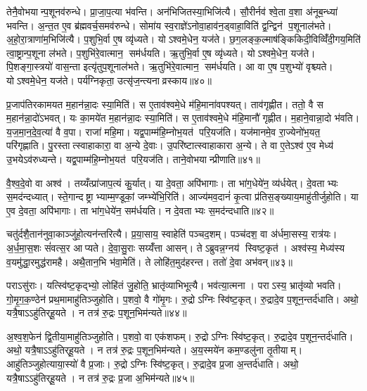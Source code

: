 तेनै॒वोभयान्प॒शूनव॑रुन्धे। प्रा॒जा॒प॒त्या भ॑वन्ति। अन॑भिजितस्या॒भिजि॑त्यै। सौ॒रीर्नव॑ श्वे॒ता व॒शा अ॑नूब॒न्ध्या॑ भवन्ति। अ॒न्त॒त ए॒व ब्र॑ह्मवर्च॒समव॑रुन्धे। सोमा॑य स्व॒राज्ञे॑ऽनोवा॒हाव॑न॒ड्वाहा॒विति॑ द्व॒न्द्विन॑ प॒शूनाल॑भते। अ॒हो॒रा॒त्राणा॑म॒भिजि॑त्यै। प॒शुभि॒र्वा ए॒ष व्यृ॑ध्यते। योऽश्वमे॒धेन॒ यज॑ते। छ॒ग॒लङ्क॒ल्माष॑ङ्किकिदी॒विव्विँ॑दी॒गय॒मिति॑ त्वा॒ष्ट्रान्प॒शूना ल॑भते। प॒शुभि॑रे॒वात्मान॒ सम॑र्धयति। ऋ॒तुभि॒र्वा ए॒ष व्यृ॑ध्यते। योऽश्वमे॒धेन॒ यज॑ते। पि॒शङ्गा॒स्त्रयो॑ वास॒न्ता इत्यृ॑तुप॒शूनाल॑भते। ऋ॒तुभि॑रे॒वात्मान॒ सम॑र्धयति। आ वा ए॒ष प॒शुभ्यो॑ वृश्च्यते। योऽश्वमे॒धेन॒ यज॑ते। पर्य॑ग्निकृता॒ उत्सृ॑ज॒न्त्यनाव्रस्काय॥४०॥\anuvakamend[ल॒भ्य॒न्ते॒ ल॒भ॒ते॒ त्वा॒ष्ट्रान्प॒शूनाल॑भते॒ऽष्टौ च॑]

प्र॒जाप॑तिरकामयत म॒हान॑न्ना॒दः स्या॒मिति॑। स ए॒ताव॑श्वमे॒धे म॑हि॒माना॑वपश्यत्। ताव॑गृह्णीत। ततो॒ वै स म॒हान॑न्ना॒दो॑ऽभवत्। यः का॒मये॑त म॒हान॑न्ना॒दः स्या॒मिति॑। स ए॒ताव॑श्वमे॒धे म॑हि॒मानौ॑ गृह्णीत। म॒हाने॒वान्ना॒दो भ॑वति। य॒ज॒मा॒न॒दे॒व॒त्या॑ वै व॒पा। राजा॑ महि॒मा। यद्व॒पाम्म॑हि॒म्नोभ॒यत॑ परि॒यज॑ति। यज॑मानमे॒व रा॒ज्येनो॑भ॒यत॒ परि॑गृह्णाति। पु॒रस्तात्स्वाहाकारा॒ वा अ॒न्ये दे॒वाः। उ॒परि॑ष्टात्स्वाहाकारा अ॒न्ये। ते वा ए॒तेऽश्व॑ ए॒व मेध्य॑ उ॒भयेऽव॑रुध्यन्ते। यद्व॒पाम्म॑हि॒म्नोभ॒यत॑ परि॒यज॑ति। ताने॒वोभयान्प्रीणाति॥४१॥\anuvakamend[प॒रि॒यज॑ति॒ षट्च॑]

वै॒श्व॒दे॒वो वा अश्व॑। तय्यँत्प्रा॑जाप॒त्यं कु॒र्यात्। या दे॒वता॒ अपि॑भागाः। ता भा॑ग॒धेये॑न॒ व्य॑र्धयेत्। दे॒वताभ्यः स॒मद॑न्दध्यात्। स्ते॒गान्दष्ट्राभ्याम्म॒ण्डूकां॒ जम्भ्ये॑भि॒रिति॑। आज्य॑मव॒दानं॑ कृ॒त्वा प्र॑तिस॒ङ्ख्याय॒माहु॑तीर्जुहोति। या ए॒व दे॒वता॒ अपि॑भागाः। ता भा॑ग॒धेये॑न॒ सम॑र्धयति। न दे॒वताभ्यः स॒मद॑न्दधाति॥४२॥

चतु॑र्दशै॒तान॑नुवा॒काञ्जु॑हो॒त्यन॑न्तरित्यै। प्र॒या॒साय॒ स्वाहेति॑ पञ्चद॒शम्। पञ्च॑दश॒ वा अ॑र्धमा॒सस्य॒ रात्र॑यः। अ॒र्ध॒मा॒स॒शः सं॑वत्स॒र आप्यते। दे॒वा॒सु॒राः सय्यँ॑त्ता आसन्। तेऽब्रुवन्न॒ग्नय॑ स्विष्ट॒कृत॑। अश्व॑स्य॒ मेध्य॑स्य व॒यमु॑द्धा॒रमुद्ध॑रामहै। अथै॒तान॒भि भ॑वा॒मेति॑। ते लोहि॑त॒मुद॑हरन्त। ततो॑ दे॒वा अभ॑वन्॥४३॥

पराऽसु॑राः। यत्स्वि॑ष्ट॒कृद्भ्यो॒ लोहि॑तं जु॒होति॒ भ्रातृ॑व्याभिभूत्यै। भव॑त्या॒त्मना। पराऽस्य॒ भ्रातृ॑व्यो भवति। गो॒मृ॒ग॒क॒ण्ठेन॑ प्रथ॒मामाहु॑तिञ्जुहोति। प॒शवो॒ वै गो॑मृ॒गः। रु॒द्रोऽग्निः स्वि॑ष्ट॒कृत्। रु॒द्रादे॒व प॒शून॒न्तर्द॑धाति। अथो॒ यत्रै॒षाऽऽहु॑तिर्‌हू॒यते। न तत्र॑ रु॒द्रः प॒शून॒भिम॑न्यते॥४४॥

अ॒श्व॒श॒फेन॑ द्वि॒तीया॒माहु॑तिञ्जुहोति। प॒शवो॒ वा एक॑शफम्। रु॒द्रोऽग्निः स्वि॑ष्ट॒कृत्। रु॒द्रादे॒व प॒शून॒न्तर्द॑धाति। अथो॒ यत्रै॒षाऽऽहु॑तिर्‌हू॒यते। न तत्र॑ रु॒द्रः प॒शून॒भिम॑न्यते। अ॒य॒स्मये॑न कम॒ण्डलु॑ना तृ॒तीयाम्। आहु॑तिञ्जुहोत्याया॒स्यो॑ वै प्र॒जाः। रु॒द्रोऽग्निः स्वि॑ष्ट॒कृत्। रु॒द्रादे॒व प्र॒जा अ॒न्तर्द॑धाति। अथो॒ यत्रै॒षाऽऽहु॑तिर्‌हू॒यते। न तत्र॑ रु॒द्रः प्र॒जा अ॒भिम॑न्यते॥४५॥\anuvakamend[द॒धा॒त्यभ॑वन्मन्यते प्र॒जा अ॒न्तर्द॑धाति॒ द्वे च॑ ]

